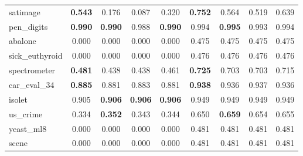 \begin{figure}[ht]
\begin{tabular}{p{22mm}|*4{p{14mm}}|*4{p{14mm}}}
        satimage&\multicolumn{1}{c}{\textbf{0.543}}&\multicolumn{1}{c}{0.176}&\multicolumn{1}{c}{0.087}&\multicolumn{1}{c|}{0.320}&\multicolumn{1}{c}{\textbf{0.752}}&\multicolumn{1}{c}{0.564}&\multicolumn{1}{c}{0.519}&\multicolumn{1}{c}{0.639}\\
        pen\_digits&\multicolumn{1}{c}{\textbf{0.990}}&\multicolumn{1}{c}{\textbf{0.990}}&\multicolumn{1}{c}{0.988}&\multicolumn{1}{c|}{\textbf{0.990}}&\multicolumn{1}{c}{0.994}&\multicolumn{1}{c}{\textbf{0.995}}&\multicolumn{1}{c}{0.993}&\multicolumn{1}{c}{0.994}\\
        abalone&\multicolumn{1}{c}{0.000}&\multicolumn{1}{c}{0.000}&\multicolumn{1}{c}{0.000}&\multicolumn{1}{c|}{0.000}&\multicolumn{1}{c}{0.475}&\multicolumn{1}{c}{0.475}&\multicolumn{1}{c}{0.475}&\multicolumn{1}{c}{0.475}\\
        sick\_euthyroid&\multicolumn{1}{c}{0.000}&\multicolumn{1}{c}{0.000}&\multicolumn{1}{c}{0.000}&\multicolumn{1}{c|}{0.000}&\multicolumn{1}{c}{0.476}&\multicolumn{1}{c}{0.476}&\multicolumn{1}{c}{0.476}&\multicolumn{1}{c}{0.476}\\
        spectrometer&\multicolumn{1}{c}{\textbf{0.481}}&\multicolumn{1}{c}{0.438}&\multicolumn{1}{c}{0.438}&\multicolumn{1}{c|}{0.461}&\multicolumn{1}{c}{\textbf{0.725}}&\multicolumn{1}{c}{0.703}&\multicolumn{1}{c}{0.703}&\multicolumn{1}{c}{0.715}\\
        car\_eval\_34&\multicolumn{1}{c}{\textbf{0.885}}&\multicolumn{1}{c}{0.881}&\multicolumn{1}{c}{0.883}&\multicolumn{1}{c|}{0.881}&\multicolumn{1}{c}{\textbf{0.938}}&\multicolumn{1}{c}{0.936}&\multicolumn{1}{c}{0.937}&\multicolumn{1}{c}{0.936}\\
        isolet&\multicolumn{1}{c}{0.905}&\multicolumn{1}{c}{\textbf{0.906}}&\multicolumn{1}{c}{\textbf{0.906}}&\multicolumn{1}{c|}{\textbf{0.906}}&\multicolumn{1}{c}{0.949}&\multicolumn{1}{c}{0.949}&\multicolumn{1}{c}{0.949}&\multicolumn{1}{c}{0.949}\\
        us\_crime&\multicolumn{1}{c}{0.334}&\multicolumn{1}{c}{\textbf{0.352}}&\multicolumn{1}{c}{0.343}&\multicolumn{1}{c|}{0.344}&\multicolumn{1}{c}{0.650}&\multicolumn{1}{c}{\textbf{0.659}}&\multicolumn{1}{c}{0.654}&\multicolumn{1}{c}{0.655}\\
        yeast\_ml8&\multicolumn{1}{c}{0.000}&\multicolumn{1}{c}{0.000}&\multicolumn{1}{c}{0.000}&\multicolumn{1}{c|}{0.000}&\multicolumn{1}{c}{0.481}&\multicolumn{1}{c}{0.481}&\multicolumn{1}{c}{0.481}&\multicolumn{1}{c}{0.481}\\
        scene&\multicolumn{1}{c}{0.000}&\multicolumn{1}{c}{0.000}&\multicolumn{1}{c}{0.000}&\multicolumn{1}{c|}{0.000}&\multicolumn{1}{c}{0.481}&\multicolumn{1}{c}{0.481}&\multicolumn{1}{c}{0.481}&\multicolumn{1}{c}{0.481}\\

\end{tabular}
\end{figure}
